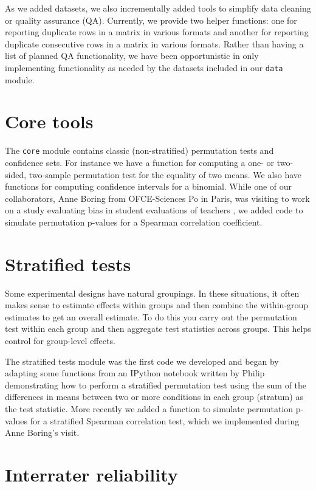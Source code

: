 As we added datasets, we also incrementally added tools to simplify data
cleaning or quality assurance (QA).  Currently, we provide two helper
functions: one for reporting duplicate rows in a matrix in various formats and
another for reporting duplicate consecutive rows in a matrix in various
formats.  Rather than having a list of planned QA functionality, we have been
opportunistic in only implementing functionality as needed by the datasets
included in our \texttt{data} module.

\section{Core tools}

The \texttt{core} module contains classic (non-stratified) permutation tests
and confidence sets.  For instance we have a function for computing a one- or
two-sided, two-sample permutation test for the equality of two means.  We also
have functions for computing confidence intervals for a binomial.
While one of our collaborators, Anne Boring from OFCE-Sciences Po in Paris, was
visiting to work on a study evaluating bias in student evaluations of teachers
\cite{boring2015}, we added code to simulate permutation p-values for a Spearman
correlation coefficient.

\section{Stratified tests}

Some experimental designs have natural groupings. In these situations, it often
makes sense to estimate effects within groups and then combine the within-group
estimates to get an overall estimate.  To do this you carry out the permutation
test within each group and then aggregate test statistics across groups. This
helps control for group-level effects.

The stratified tests module was the first code we developed and began by
adapting some functions from an IPython notebook written by Philip
demonstrating how to perform a stratified permutation test using the sum of the
differences in means between two or more conditions in each group (stratum) as
the test statistic.  More recently we added a function to simulate permutation
p-values for a stratified Spearman correlation test, which we implemented
during Anne Boring's visit.

\section{\label{sec:irr}Interrater reliability}

